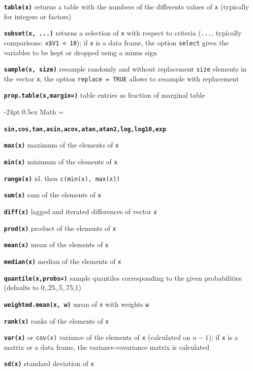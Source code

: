 \documentclass[10pt,landscape]{article}
\makeatletter
\renewcommand\section{\@startsection{section}{1}{0mm}%
                                     {-24pt}%
                                     {0.5ex}%
                                {\color{blue}\normalfont\large\bfseries}}
\newcommand{\code}{\texttt}
\newcommand{\bcode}[1]{\texttt{\textbf{#1}}}
\makeatother
\begin{document}
\begin{multicols*}{3}
\bcode{table(x)}  returns a table with the numbers of the differents values of \code{x} (typically for integers or factors)

\bcode{subset(x, ...)}  returns a selection of \code{x} with respect to criteria (\code{...}, typically comparisons: \code{x\$V1 < 10}); if \code{x} is a data frame, the option \code{select} gives the variables to be kept or dropped using a minus sign

\bcode{sample(x, size)}  resample randomly and without replacement \code{size} elements in the vector \code{x}, the option \code{replace = TRUE} allows to resample with replacement

\bcode{prop.table(x,margin=)} table entries as fraction of marginal table 




\section{Math}
\everypar={\hangindent=9mm}

\bcode{sin,cos,tan,asin,acos,atan,atan2,log,log10,exp}

\bcode{max(x)}  maximum of the elements of \code{x}

\bcode{min(x)}  minimum of the elements of \code{x}

\bcode{range(x)}  id. then \code{c(min(x), max(x))}

\bcode{sum(x)}  sum of the elements of \code{x}

\bcode{diff(x)}  lagged and iterated differences of vector \code{x}

\bcode{prod(x)}  product of the elements of \code{x}

\bcode{mean(x)}  mean of the elements of \code{x}

\bcode{median(x)}  median of the elements of \code{x}

\bcode{quantile(x,probs=)} sample quantiles
     corresponding to the given probabilities (defaults to 0,.25,.5,.75,1)

\bcode{weighted.mean(x, w)} mean of \code{x} with weights \code{w}

\bcode{rank(x)}  ranks of the elements of \code{x}

\bcode{var(x)} or \code{cov(x)}  variance of the elements of \code{x}
(calculated on $n-1$); if \code{x} is a matrix or a data frame, the
variance-covariance matrix is calculated

\bcode{sd(x)} standard deviation of \code{x}


\end{multicols*}
\end{document}
